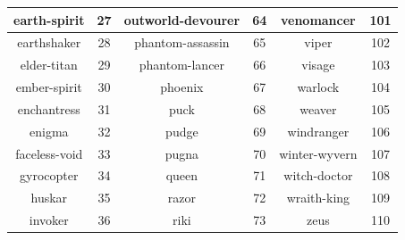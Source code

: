 \begin{table}[!tb]
\begin{tabular} {|c|c|c|c|c|c|}
\\ \hline earth-spirit&27&outworld-devourer&64&venomancer&101
\\ \hline earthshaker&28&phantom-assassin&65&viper&102
\\ \hline elder-titan&29&phantom-lancer&66&visage&103
\\ \hline ember-spirit&30&phoenix&67&warlock&104
\\ \hline enchantress&31&puck&68&weaver&105
\\ \hline enigma&32&pudge&69&windranger&106
\\ \hline faceless-void&33&pugna&70&winter-wyvern&107
\\ \hline gyrocopter&34&queen&71&witch-doctor&108
\\ \hline huskar&35&razor&72&wraith-king&109
\\ \hline invoker&36&riki&73&zeus&110
\\ \hline \end{tabular} 
\end{table}

